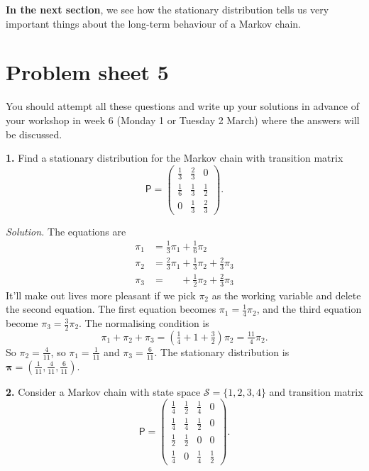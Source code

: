 \documentclass[
  a4paper,
]{article}
\newif\ifcomm\commtrue
\theoremstyle{definition}
\theoremstyle{definition}
\theoremstyle{definition}
\theoremstyle{remark}
\begin{document}
\textbf{In the next section}, we see how the stationary distribution tells us very important things about the long-term behaviour of a Markov chain.

\hypertarget{P05}{%
\section*{Problem sheet 5}\label{P05}}

\commtrue

You should attempt all these questions and write up your solutions in advance of your workshop in week 6 (Monday 1 or Tuesday 2 March) where the answers will be discussed.

\textbf{1.} Find a stationary distribution for the Markov chain with transition matrix
\[ \mathsf P = \begin{pmatrix} \frac13 & \frac23 & 0 \\
                               \frac16 & \frac13 & \frac12 \\
                               0 & \frac13 & \frac23 \end{pmatrix} . \]

\begin{myanswers}
\emph{Solution.} The equations are
\begin{align*}
\pi_1 &= \tfrac13 \pi_1 + \tfrac16 \pi_2 \\
\pi_2 &= \tfrac23 \pi_1 + \tfrac13 \pi_2 + \tfrac23 \pi_3 \\
\pi_3 &= \phantom{\tfrac23 \pi_1} + \tfrac12 \pi_2 + \tfrac23 \pi_3
\end{align*}
It'll make out lives more pleasant if we pick \(\pi_2\) as the working variable and delete the second equation. The first equation becomes \(\pi_1 = \tfrac14 \pi_2\), and the third equation become \(\pi_3 = \tfrac32 \pi_2\). The normalising condition is
\[ \pi_1 + \pi_2 + \pi_3 = \left( \tfrac14 + 1 + \tfrac32\right) \pi_2 = \tfrac{11}{4} \pi_2 .    \]
So \(\pi_2 = \frac4{11}\), so \(\pi_1 = \frac{1}{11}\) and \(\pi_3 = \frac{6}{11}\). The stationary distribution is \(\boldsymbol\pi = (\frac{1}{11}, \frac{4}{11}, \frac{6}{11})\).

\end{myanswers}

\textbf{2.} Consider a Markov chain with state space \(\mathcal S = \{1,2,3,4\}\) and transition matrix
\[  \mathsf P = \begin{pmatrix} \frac14 & \frac12 &\frac14 & 0 \\
                      \frac14 & \frac14 & \frac12 & 0 \\
                      \frac12 & \frac12 & 0 & 0 \\
                      \frac14 & 0       &\frac14 & \frac 12
                      \end{pmatrix} . \]
\end{document}
